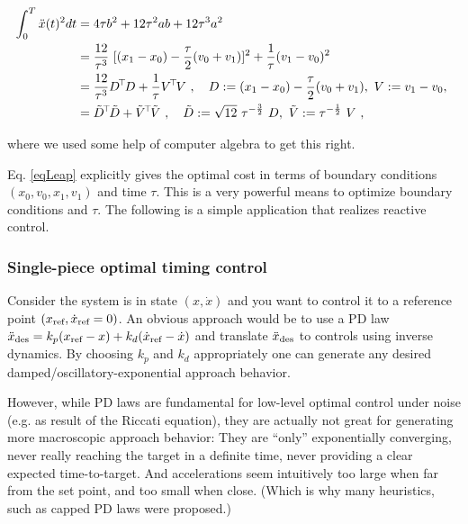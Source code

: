 \begin{align}
\int_0^T \ddot x(t)^2 dt
&= 4 \tau b^2  + 12 \tau^2 ab + 12 \tau^3 a^2 \\
&= \frac{12}{\tau^3}~[(x_1 - x_0)-\frac{\tau}{2}(v_0+v_1)]^2+\frac{1}{\tau}(v_1-v_0)^2 \label{eqLeap}\\
&= \frac{12}{\tau^3} D^\T D + \frac{1}{\tau} V^\T V \comma D := (x_1 - x_0)-\frac{\tau}{2}(v_0+v_1),~ V:=v_1-v_0,~ \\
&= \tilde D^\T \tilde D + \tilde V^\T \tilde V \comma
\tilde D := \sqrt{12}~ \tau^{-\frac{3}{2}}~ D,~ \tilde V := \tau^{-\half}~ V ~,
\label{eqLeapSOS}
\end{align}

where we used some help of computer algebra to get this right.

Eq. \eqref{eqLeap} explicitly gives the optimal cost in terms of
boundary conditions $(x_0,v_0,x_1,v_1)$ and time $\tau$. This is a very powerful means to optimize boundary conditions and $\tau$. The following is a simple application that realizes reactive control.

\subsubsection{Single-piece optimal timing control}

Consider the system is in state $(x,\dot x)$ and you want to control it to a reference point $(x_{\text{ref}}, \dot x_{\text{ref}}=0)$. An obvious approach would be to use a PD law $\ddot x_{\text{des}} = k_p (x_{\text{ref}} - x) + k_d (\dot x_{\text{ref}} - \dot x)$ and translate $\ddot x_{\text{des}}$ to controls using inverse dynamics. By choosing $k_p$ and $k_d$ appropriately one can generate any desired damped/oscillatory-exponential approach behavior.

However, while PD laws are fundamental for low-level optimal control under noise (e.g. as result of the Riccati equation), they are actually not great for generating more macroscopic approach behavior: They are ``only'' exponentially converging, never really reaching the target in a definite time, never providing a clear expected time-to-target. And accelerations seem intuitively too large when far from the set point, and too small when close. (Which is why many heuristics, such as capped PD laws were proposed.)

